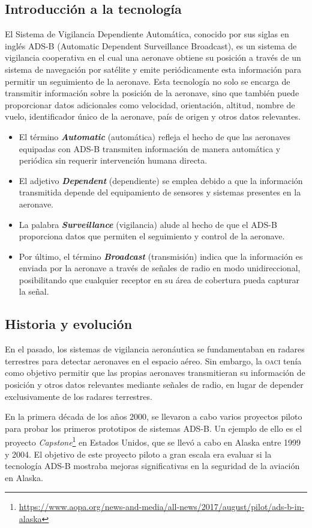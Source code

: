 \documentclass[a4paper, 11pt]{book}
\begin{document}
\subsection{Introducción a la tecnología}
El Sistema de Vigilancia Dependiente Automática, conocido por sus siglas en inglés \textsc{ADS-B} (Automatic Dependent Surveillance Broadcast), es un sistema de vigilancia cooperativa en el cual una aeronave obtiene su posición a través de un sistema de navegación por satélite y emite periódicamente esta información para permitir un seguimiento de la aeronave.
Esta tecnología no solo se encarga de transmitir información sobre la posición de la aeronave, sino que también puede proporcionar datos adicionales como velocidad, orientación, altitud, nombre de vuelo, identificador único de la aeronave, país de origen y otros datos relevantes.
\begin{itemize}
	\item El término \textbf{\emph{Automatic}} (automática) refleja el hecho de que las aeronaves equipadas con \textsc{ADS-B} transmiten información de manera automática y periódica sin requerir intervención humana directa.
	\item El adjetivo \textbf{\emph{Dependent}} (dependiente) se emplea debido a que la información transmitida depende del equipamiento de sensores y sistemas presentes en la aeronave.
	\item La palabra \textbf{\emph{Surveillance}} (vigilancia) alude al hecho de que el \textsc{ADS-B} proporciona datos que permiten el seguimiento y control de la aeronave.
	\item Por último, el término\textbf{ \emph{Broadcast}} (transmisión) indica que la información es enviada por la aeronave a través de señales de radio en modo unidireccional, posibilitando que cualquier receptor en su área de cobertura pueda capturar la señal.
\end{itemize}
\subsection{Historia y evolución}
En el pasado, los sistemas de vigilancia aeronáutica se fundamentaban en radares terrestres para detectar aeronaves en el espacio aéreo. Sin embargo, la \textsc{\gls{oaci}} tenía como objetivo permitir que las propias aeronaves transmitieran su información de posición y otros datos relevantes mediante señales de radio, en lugar de depender exclusivamente de los radares terrestres.

En la primera década de los años 2000, se llevaron a cabo varios proyectos piloto para probar los primeros prototipos de sistemas \textsc{ADS-B}. Un ejemplo de ello es el proyecto \emph{Capstone}\footnote{\url{https://www.aopa.org/news-and-media/all-news/2017/august/pilot/ads-b-in-alaska}} en Estados Unidos, que se llevó a cabo en Alaska entre 1999 y 2004. El objetivo de este proyecto piloto a gran escala era evaluar si la tecnología \textsc{ADS-B} mostraba mejoras significativas en la seguridad de la aviación en Alaska.
\end{document}
